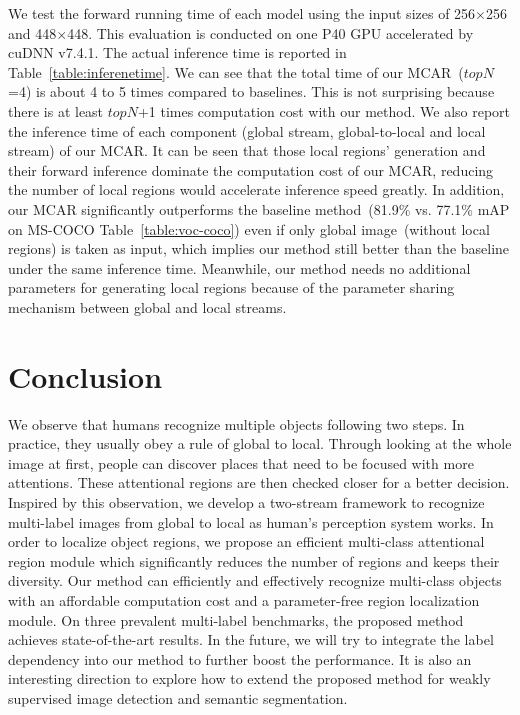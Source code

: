 \documentclass[journal]{IEEEtran}
\begin{document}
We test the forward running time of each model using the input sizes of 256$\times$256 and 448$\times$448. This evaluation is conducted on one P40 GPU accelerated by cuDNN v7.4.1. The actual inference time is reported  in Table~\ref{table:inferenetime}. We can see that the total time of our MCAR~($topN$=4) is about 4 to 5 times compared to baselines. This is not surprising because there is at least $topN$+1 times computation cost with our method.  We also report the inference time of each component (global stream, global-to-local and local stream) of our MCAR. It can be seen that those local regions' generation and their forward inference dominate the computation cost of our MCAR, reducing the number of local regions would accelerate inference speed greatly. In addition, our MCAR significantly outperforms the baseline method~(81.9\% vs. 77.1\% mAP on MS-COCO Table~\ref{table:voc-coco}) even if only global image~(without local regions) is taken as input, which implies our method still better than the baseline under the same inference time. Meanwhile, our method needs no additional parameters for generating local regions because of the parameter sharing mechanism between global and local streams.

\section{Conclusion}\label{cons}
We observe that humans recognize multiple objects following two steps. In practice, they usually obey a rule of global to local. Through looking at the whole image at first, people can discover places that need to be focused with more attentions. These attentional regions are then checked closer for a better decision. Inspired by this observation, we develop a two-stream framework to recognize multi-label images from global to local as human's perception system works. In order to localize object regions, we propose an efficient multi-class attentional region module which significantly reduces the number of regions and keeps their diversity. Our method can efficiently and effectively recognize multi-class objects with an affordable computation cost and a parameter-free region localization module. On three prevalent multi-label benchmarks, the proposed method achieves state-of-the-art results. In the future, we will try to integrate the label dependency into our method to further boost the performance. It is also an interesting direction to explore how to extend the proposed method for weakly supervised image detection and semantic segmentation. 
\end{document}
